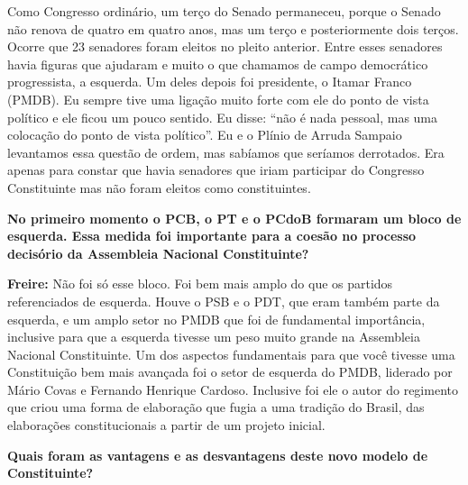Como Congresso ordinário, um terço do Senado permaneceu, porque o Senado
não renova de quatro em quatro anos, mas um terço e posteriormente dois
terços. Ocorre que 23 senadores foram eleitos no pleito anterior. Entre
esses senadores havia figuras que ajudaram e muito o que chamamos de
campo democrático progressista, a esquerda. Um deles depois foi
presidente, o Itamar Franco (PMDB). Eu sempre tive uma ligação muito
forte com ele do ponto de vista político e ele ficou um pouco sentido.
Eu disse: ``não é nada pessoal, mas uma colocação do ponto de vista
político''. Eu e o Plínio de Arruda Sampaio levantamos essa questão de
ordem, mas sabíamos que seríamos derrotados. Era apenas para constar que
havia senadores que iriam participar do Congresso Constituinte mas não
foram eleitos como constituintes.

\textbf{No primeiro momento o PCB, o PT e o PCdoB formaram um bloco de
esquerda. Essa medida foi importante para a coesão no processo decisório
da Assembleia Nacional Constituinte?}

\textbf{Freire:} Não foi só esse bloco. Foi bem mais amplo do que os
partidos referenciados de esquerda. Houve o PSB e o PDT, que eram também
parte da esquerda, e um amplo setor no PMDB que foi de fundamental
importância, inclusive para que a esquerda tivesse um peso muito grande
na Assembleia Nacional Constituinte. Um dos aspectos fundamentais para
que você tivesse uma Constituição bem mais avançada foi o setor de
esquerda do PMDB, liderado por Mário Covas e Fernando Henrique Cardoso.
Inclusive foi ele o autor do regimento que criou uma forma de elaboração
que fugia a uma tradição do Brasil, das elaborações constitucionais a
partir de um projeto inicial.

\textbf{Quais foram as vantagens e as desvantagens deste novo modelo de
Constituinte?}

